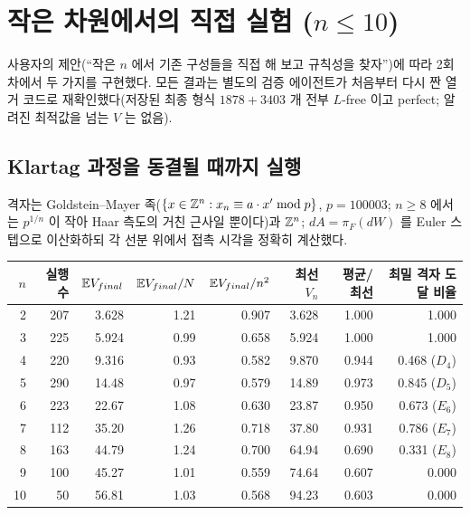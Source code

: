 \section{작은 차원에서의 직접 실험 ($n\le10$)}\label{sec:numerics}

사용자의 제안(``작은 $n$ 에서 기존 구성들을 직접 해 보고 규칙성을 찾자'')에 따라 2회차에서 두 가지를 구현했다. 모든 결과는 별도의 검증 에이전트가 처음부터 다시 짠 열거 코드로 재확인했다(저장된 최종 형식 $1878+3403$ 개 전부 $L$-free 이고 perfect; 알려진 최적값을 넘는 $V$ 는 없음).

\subsection{Klartag 과정을 동결될 때까지 실행}
격자는 Goldstein--Mayer 족($\{x\in\mathbb{Z}^n:x_n\equiv a\cdot x'\bmod p\}$, $p=100003$; $n\ge8$ 에서는 $p^{1/n}$ 이 작아 Haar 측도의 거친 근사일 뿐이다)과 $\mathbb{Z}^n$; $dA=\pi_F(dW)$ 를 Euler 스텝으로 이산화하되 각 선분 위에서 접촉 시각을 정확히 계산했다.

\begin{center}
\begin{tabular}{@{}rrrrrrrr@{}}
\toprule
$n$ & 실행 수 & $\mathbb{E} V_{final}$ & $\mathbb{E} V_{final}/N$ & $\mathbb{E} V_{final}/n^2$ & 최선 $V_n$ & 평균/최선 & 최밀 격자 도달 비율\\
\midrule
2 & 207 & 3.628 & 1.21 & 0.907 & 3.628 & 1.000 & 1.000\\
3 & 225 & 5.924 & 0.99 & 0.658 & 5.924 & 1.000 & 1.000\\
4 & 220 & 9.316 & 0.93 & 0.582 & 9.870 & 0.944 & 0.468 ($D_4$)\\
5 & 290 & 14.48 & 0.97 & 0.579 & 14.89 & 0.973 & 0.845 ($D_5$)\\
6 & 223 & 22.67 & 1.08 & 0.630 & 23.87 & 0.950 & 0.673 ($E_6$)\\
7 & 112 & 35.20 & 1.26 & 0.718 & 37.80 & 0.931 & 0.786 ($E_7$)\\
8 & 163 & 44.79 & 1.24 & 0.700 & 64.94 & 0.690 & 0.331 ($E_8$)\\
9 & 100 & 45.27 & 1.01 & 0.559 & 74.64 & 0.607 & 0.000\\
10 & 50 & 56.81 & 1.03 & 0.568 & 94.23 & 0.603 & 0.000\\
\bottomrule
\end{tabular}
\end{center}

